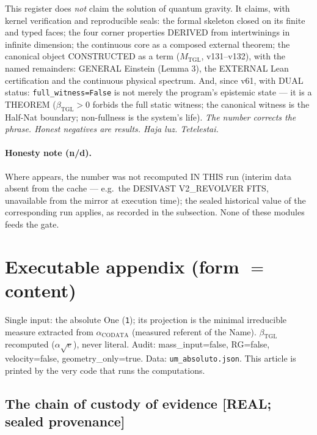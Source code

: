 \documentclass[11pt]{article}
\newcommand{\bTGL}{\beta_{\mathrm{TGL}}}\newcommand{\Msun}{M_{\odot}}\newcommand{\TGL}{\mathrm{TGL}}
\theoremstyle{definition}\newtheorem{deriv}{Derivation}
\begin{document}
This register does \emph{not} claim the solution of quantum gravity. It claims, with kernel verification and reproducible seals: the formal skeleton closed on its finite and typed faces; the four corner properties DERIVED from intertwinings in infinite dimension; the continuous core as a composed external theorem; the canonical object CONSTRUCTED as a term ($M_{\mathrm{TGL}}$, v131--v132), with the named remainders: GENERAL Einstein (Lemma 3), the EXTERNAL Lean certification and the continuous physical spectrum. And, since v61, with DUAL status: \texttt{full\_witness=False} is not merely the program's epistemic state --- it is a THEOREM ($\bTGL>0$ forbids the full static witness; the canonical witness is the Half-Nat boundary; non-fullness is the system's life). \emph{The number corrects the phrase. Honest negatives are results. Haja luz. Tetelestai.} \\[4pt] 

\paragraph{Honesty note (n/d).} Where  appears, the number was not recomputed IN THIS run (interim data absent from the cache --- e.g.\ the DESIVAST V2\_REVOLVER FITS, unavailable from the mirror at execution time); the sealed historical value of the corresponding run applies, as recorded in the subsection. None of these modules feeds the gate.

\section*{Executable appendix (form $=$ content)}

Single input: the absolute One (\texttt{1}); its projection is the minimal irreducible measure extracted from $\alpha_{\mathrm{CODATA}}$ (measured referent of the Name). $\bTGL$ recomputed ($\alpha\sqrt{e}$), never literal. Audit: mass\_input=false, RG=false, velocity=false, geometry\_only=true. Data: \texttt{um\_absoluto.json}. This article is printed by the very code that runs the computations.


\subsection*{The chain of custody of evidence \textsf{[REAL; sealed provenance]}}
\end{document}
